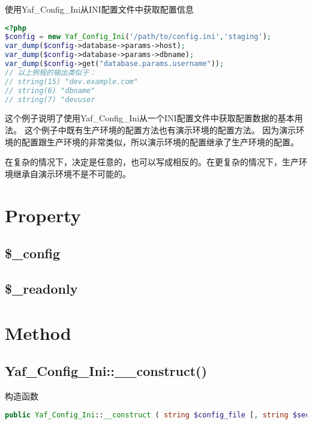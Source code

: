 \begin{example}
使用Yaf\_Config\_Ini从INI配置文件中获取配置信息
\begin{lstlisting}[language=PHP]
<?php
$config = new Yaf_Config_Ini('/path/to/config.ini','staging');
var_dump($config->database->params->host); 
var_dump($config->database->params->dbname);
var_dump($config->get("database.params.username"));
// 以上例程的输出类似于：
// string(15) "dev.example.com"
// string(6) "dbname"
// string(7) "devuser
\end{lstlisting}
\end{example}

这个例子说明了使用Yaf\_Config\_Ini从一个INI配置文件中获取配置数据的基本用法。 这个例子中既有生产环境的配置方法也有演示环境的配置方法。 因为演示环境的配置跟生产环境的非常类似，所以演示环境的配置继承了生产环境的配置。 

在复杂的情况下，决定是任意的，也可以写成相反的。在更复杂的情况下，生产环境继承自演示环境不是不可能的。


\section{Property}

\subsection{\$\_config}



\subsection{\$\_readonly}


\section{Method}


\subsection{Yaf\_Config\_Ini::\_\_construct()}


构造函数




\begin{lstlisting}[language=PHP]
public Yaf_Config_Ini::__construct ( string $config_file [, string $section ] )
\end{lstlisting}








